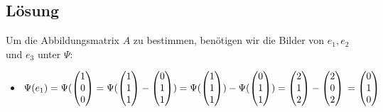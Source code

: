 \subsection*{L\"osung}
Um die Abbildungsmatrix $A$ zu bestimmen, benötigen wir die Bilder von $e_1,e_2$ und $e_3$ unter $\Psi$:
\begin{itemize}
\item $\Psi(e_1)=\Psi(\begin{pmatrix} 1 \\ 0\\0\end{pmatrix}=\Psi(\begin{pmatrix}1\\1\\1 \end{pmatrix}-\begin{pmatrix} 0\\1\\1\end{pmatrix})=\Psi(\begin{pmatrix}1\\1\\1 \end{pmatrix})-\Psi(\begin{pmatrix} 0\\1\\1\end{pmatrix})=\begin{pmatrix}2 \\ 1 \\ 2 \end{pmatrix}-\begin{pmatrix} 2 \\ 0 \\ 2\end{pmatrix}\\=\begin{pmatrix} 0 \\ 1 \\ 0\end{pmatrix}$

\end{itemize}
